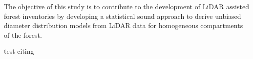 The objective of this study is to contribute to the development of LiDAR assisted forest inventories by developing a statistical sound approach to derive unbiased diameter distribution models from LiDAR data for homogeneous compartments of the forest.

test citing \cite{fahrmeir2003regression}

